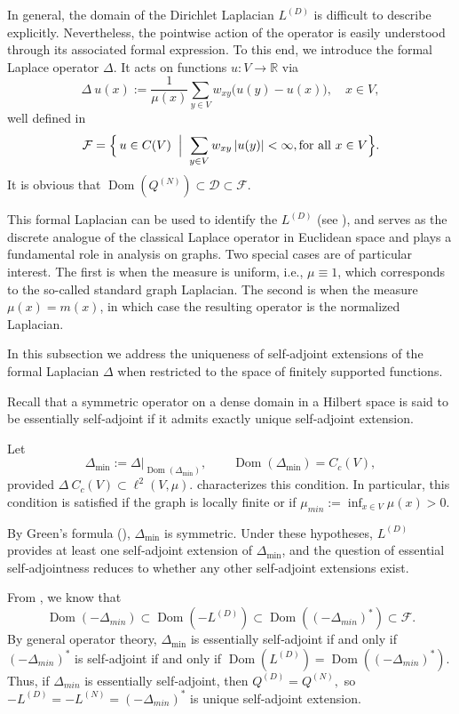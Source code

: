 \documentclass[reqno,12pt]{amsart}
\numberwithin{equation}{section}
\begin{document}
In general, the domain of the Dirichlet Laplacian $L^{(D)}$ is difficult to describe explicitly. Nevertheless, the pointwise action of the operator is easily understood through its associated formal expression. To this end, we introduce the formal Laplace operator $\Delta$. It acts on functions $u : V \to \mathbb{R}$ via
\[
\Delta \:u(x) := \frac{1}{\mu(x)} \sum_{y \in V} w_{xy} \bigl( u(y) - u(x) \bigr), \quad x \in V,
\]
well defined in
\[
\mathcal{F}=\Bigl\{\,u\in C(V)\;\Bigm|\;\sum_{y\in V}w_{xy}\,\lvert u(y)\rvert<\infty, \text{for all }x\in V\Bigr\} .
\]
It is obvious that $\operatorname{Dom}(Q^{\left(N\right)}) \subset \mathcal{D}\subset \mathcal{F}.$

This formal Laplacian can be used to identify the $L^{\left(D\right)}$ (see \cite[Theorem~1.6]{keller2021graphs}), and serves as the discrete analogue of the classical Laplace operator in Euclidean space and plays a fundamental role in analysis on graphs. Two special cases are of particular interest. The first is when the measure is uniform, i.e., \(\mu \equiv 1\), which corresponds to the so-called standard graph Laplacian. The second is when the measure \(\mu(x)  = m(x)\), in which case the resulting operator is the normalized Laplacian.


In this subsection we address the uniqueness of self‐adjoint extensions of the formal Laplacian $\Delta$ when restricted to the space of finitely supported functions. 


Recall that a symmetric operator on a dense domain in a Hilbert space is said to be essentially self‐adjoint if it admits exactly unique self‐adjoint extension.

Let
\[
\Delta_{\min} := \Delta\big|_{\operatorname{Dom}(\Delta_{\min})}, 
\qquad
\operatorname{Dom}(\Delta_{\min}) = C_c(V),
\]
provided $\Delta \:C_c(V)\subset \ell^2(V,\mu)$.  \cite[Theorem~1.29]{keller2021graphs} characterizes this condition. In particular, this condition is satisfied if the graph is locally finite or if $\mu_{min}:=\inf_{x\in V} \mu(x)>0.$


By Green’s formula (\cite[Proposition 1.5]{keller2021graphs}), $\Delta_{\min}$ is symmetric. 
Under these hypotheses, $L^{(D)}$ provides at least one self‐adjoint extension of $\Delta_{\min}$, and the question of essential self‐adjointness reduces to whether any other self‐adjoint extensions exist.


From \cite{keller2021graphs}, we know that
\[\operatorname{Dom}\left(-\Delta_{min}\right)\subset \operatorname{Dom}\left(-L^{\left(D\right)}\right)\subset \operatorname{Dom}\left(\left(-\Delta_{min}\right)^{*}\right)\subset \mathcal{F}.\]
By general operator theory, $\Delta_{\min}$ is essentially self‐adjoint if and only if $\left(-\Delta_{min}\right)^*$ is self‐adjoint if and only if $\operatorname{Dom}\left(L^{\left(D\right)}\right)= \operatorname{Dom}\left(\left(-\Delta_{min}\right)^{*}\right)$. Thus, if $\Delta_{min}$ is essentially self‐adjoint, then $Q^{\left(D\right)}=Q^{\left(N\right)},$ so $-L^{\left(D\right)}=-L^{\left(N\right)}=\left(-\Delta_{min}\right)^{*}$ is unique self‐adjoint extension.
\end{document}
